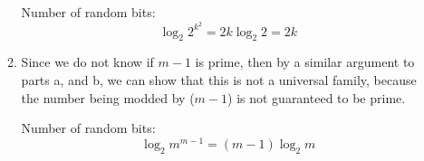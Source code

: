 \documentclass[11pt]{article}
\begin{document}
\begin{enumerate}
\begin{enumerate}
Number of random bits:
\begin{equation*}
\log_2 2^{k^2} = 2k \log_2 2 = 2k
\end{equation*}
\item
Since we do not know if $m-1$ is prime, then by a similar argument to parts a,
and b, we can show that this is not a universal family, because the number being
modded by ($m-1$) is not guaranteed to be prime. 

Number of random bits:
\begin{equation*}
\log_2 m^{m-1} = (m-1) \log_2 m
\end{equation*}

\end{enumerate}
\end{enumerate}
\end{document}
